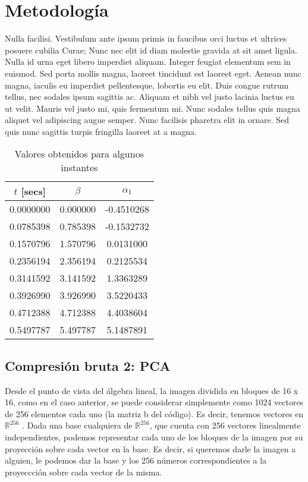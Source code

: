 \documentclass[twocolumn,a4paper,10pt]{article}
\begin{document}
\section{Metodología}
Nulla facilisi. Vestibulum ante ipsum primis in faucibus orci luctus et ultrices posuere cubilia Curae; Nunc nec elit id diam molestie gravida at sit amet ligula. Nulla id urna eget libero imperdiet aliquam. Integer feugiat elementum sem in euismod. Sed porta mollis magna, laoreet tincidunt est laoreet eget. Aenean nunc magna, iaculis eu imperdiet pellentesque, lobortis eu elit. Duis congue rutrum tellus, nec sodales ipsum sagittis ac. Aliquam et nibh vel justo lacinia luctus eu ut velit. Mauris vel justo mi, quis fermentum mi. Nunc sodales tellus quis magna aliquet vel adipiscing augue semper. Nunc facilisis pharetra elit in ornare. Sed quis nunc sagittis turpis fringilla laoreet at a magna.
\begin{table}
    \center
    \begin{tabular}{c|c|c}
            $t$ [secs] & $\beta$ & $\alpha_1$ \\ \hline \hline
       0.0000000  &  0.000000  & -0.4510268 \\
       0.0785398  &  0.785398  & -0.1532732 \\
       0.1570796  &  1.570796  &  0.0131000 \\
       0.2356194  &  2.356194  &  0.2125534 \\
       0.3141592  &  3.141592  &  1.3363289 \\
       0.3926990  &  3.926990  &  3.5220433 \\
       0.4712388  &  4.712388  &  4.4038604 \\
       0.5497787  &  5.497787  &  5.1487891 \\

    \end{tabular}
    \caption{Valores obtenidos para algunos instantes}
    \label{tabla_segundo_punto}
\end{table}

\subsection{Compresión bruta 2: PCA}

Desde el punto de vista del  \'algebra lineal, la imagen dividida en bloques de 16 x 16, como en el caso anterior, se puede considerar simplemente como
1024 vectores de 256 elementos cada uno (la matriz b del código). Es decir, tenemos vectores en $\mathbb{R}^{256}$ . Dada una base cualquiera de $\mathbb{R}^{256}$,
 que cuenta con 256 vectores linealmente independientes, podemos representar cada uno de los bloques de la imagen por su proyecci\'on sobre cada vector en la base. 
Es decir, si queremos darle la imagen a alguien, le podemos dar la base y los 256 n\'umeros correspondientes a la proyeccci\'on sobre cada vector de la misma. \\
\end{document}
